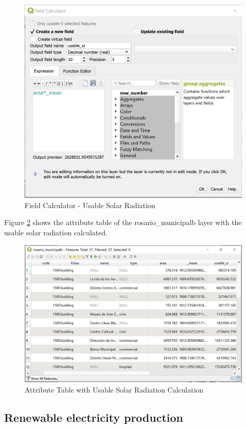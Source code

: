 \documentclass[
]{book}
\begin{document}
\begin{figure}

{\centering \includegraphics[width=0.7\linewidth]{images/fieldc2} 

}

\caption{Field Calculator - Usable Solar Radiation}\label{fig:img-192}
\end{figure}

Figure \ref{fig:img-193} shows the attribute table of the {rosario\_municipalb} layer with the usable solar radiation calculated.

\begin{figure}

{\centering \includegraphics[width=1\linewidth]{images/usablesr} 

}

\caption{Attribute Table with Usable Solar Radiation Calculation}\label{fig:img-193}
\end{figure}

\hypertarget{renewable-electricity-production}{%
\subsection{Renewable electricity production}\label{renewable-electricity-production}}
\end{document}
